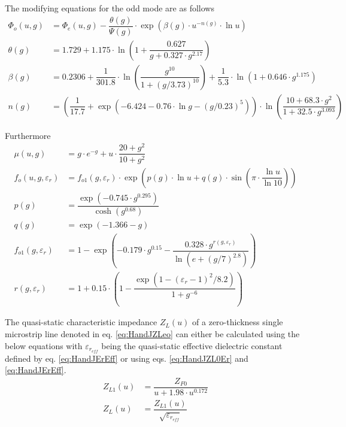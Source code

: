 \documentclass[10pt]{report}
\begin{document}
The modifying equations for the odd mode are as follows
\begin{align}
\Phi_o\left(u,g\right) &= \Phi_e\left(u,g\right)-\dfrac{\theta(g)}{\Psi(g)}\cdot \exp{\left(\beta(g)\cdot u^{-n(g)}\cdot\ln{u}\right)}\\
\theta(g) &= 1.729+1.175\cdot\ln{\left(1+\dfrac{0.627}{g+0.327\cdot g^{2.17}}\right)}\\
\beta(g) &= 0.2306+\dfrac{1}{301.8}\cdot\ln{\left(\dfrac{g^{10}}{1+\left(g/3.73\right)^{10}}\right)} +\dfrac{1}{5.3}\cdot\ln{\left(1+0.646\cdot g^{1.175}\right)}\\
n(g) &= \left(\dfrac{1}{17.7} + \exp{\left(-6.424 - 0.76\cdot \ln{g} - \left(g/0.23\right)^5\right)}\right)\cdot \ln{\left(\dfrac{10 + 68.3\cdot g^2}{1+32.5\cdot g^{3.093}}\right)}
\end{align}

Furthermore
\begin{align}
\mu\left(u,g\right) &= g\cdot e^{-g}+ u\cdot \dfrac{20+g^2}{10+g^2}\\
f_o\left(u,g,\varepsilon_r\right) &= f_{o1}\left(g,\varepsilon_r\right)\cdot \exp{\left(p(g)\cdot \ln{u} + q(g)\cdot \sin{\left(\pi\cdot\dfrac{\ln{u}}{\ln{10}}\right)}\right)}\\
p(g) &= \dfrac{\exp{\left(-0.745\cdot g^{0.295}\right)}}{\cosh{\left(g^{0.68}\right)}}\\
q(g) &= \exp{\left(-1.366-g\right)}\\
f_{o1}\left(g,\varepsilon_r\right) &= 1 - \exp{\left(-0.179\cdot g^{0.15} - \dfrac{0.328\cdot g^{r\left(g,\varepsilon_r\right)}}{\ln{\left(e + \left(g/7\right)^{2.8}\right)}}\right)}\\
r\left(g,\varepsilon_r\right) &= 1+0.15\cdot\left(1 - \dfrac{\exp{\left(1-\left(\varepsilon_r - 1\right)^2/8.2\right)}}{1+g^{-6}}\right)
\end{align}

The quasi-static characteristic impedance $Z_L(u)$ of a zero-thickness
single microstrip line denoted in eq. \eqref{eq:HandJZLeo} can either
be calculated using the below equations with $\varepsilon_{r_{eff}}$
being the quasi-static effective dielectric constant defined by
eq. \eqref{eq:HandJErEff} or using eqs. \eqref{eq:HandJZL0Er} and
\eqref{eq:HandJErEff}.
\begin{align}
Z_{L1}(u) &= \dfrac{Z_{F0}}{u + 1.98\cdot u^{0.172}}\\
Z_{L}(u) &= \dfrac{Z_{L1}(u)}{\sqrt{\varepsilon_{r_{eff}}}}
\end{align}
\end{document}

